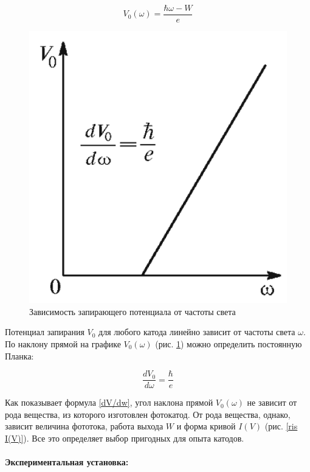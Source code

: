 \documentclass[a4paper, 12pt]{article}
\newcommand{\parag}[1]{\paragraph*{#1:}}
\begin{document}
\begin{equation}\label{V(w)}
V_0 (\omega) = \dfrac{\hbar\omega - W}{e}
\end{equation}

\begin{figure}[!h]
    \centering
\includegraphics[scale=0.3]{V(w)}
    \caption{Зависимость запирающего потенциала
        от частоты света}
    \label{ris V(w)}
\end{figure}

Потенциал запирания $ V_0 $ для любого катода линейно зависит от
частоты света $ \omega $. По наклону прямой на графике $ V_0(\omega) $ (рис. \ref{ris V(w)}) можно определить постоянную Планка:

\begin{equation}\label{dV/dw}
\dfrac{dV_0}{d\omega} = \dfrac{\hbar}{e}
\end{equation}

Как показывает формула \eqref{dV/dw}, угол наклона прямой $ V_0(\omega) $ не зависит от рода вещества, из которого изготовлен фотокатод. От рода вещества, однако, зависит величина фототока, работа выхода $ W $ и форма кривой $ I(V) $ (рис. \ref{ris I(V)}). Все это определяет выбор пригодных для
опыта катодов.

\parag {Экспериментальная установка} ~
\end{document}
